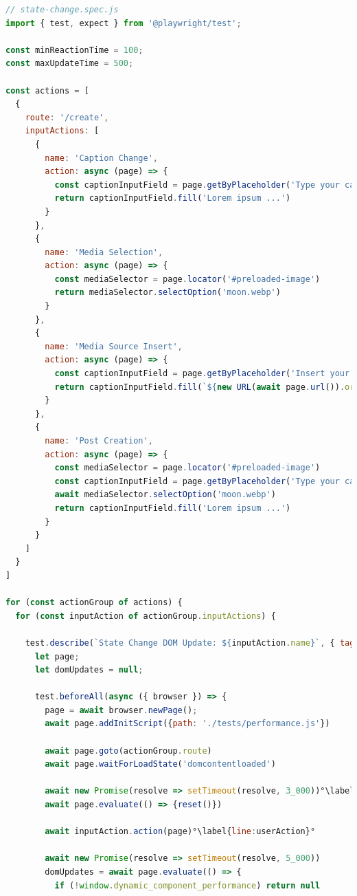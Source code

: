 \documentclass[a4paper, 10pt]{article}
\begin{document}
\begin{lstlisting}[caption={Test file for component update times}, label={lst:state-change-spec}, language=JavaScript, escapechar=°]
// state-change.spec.js
import { test, expect } from '@playwright/test';

const minReactionTime = 100;
const maxUpdateTime = 500;

const actions = [
  {
    route: '/create',
    inputActions: [
      {
        name: 'Caption Change',
        action: async (page) => {
          const captionInputField = page.getByPlaceholder('Type your caption here')
          return captionInputField.fill('Lorem ipsum ...')
        }
      },
      {
        name: 'Media Selection',
        action: async (page) => {
          const mediaSelector = page.locator('#preloaded-image')
          return mediaSelector.selectOption('moon.webp')
        }
      },
      {
        name: 'Media Source Insert',
        action: async (page) => {
          const captionInputField = page.getByPlaceholder('Insert your media URL here...')
          return captionInputField.fill(`${new URL(await page.url()).origin}/abstract-circles.webp`)
        }
      },
      {
        name: 'Post Creation',
        action: async (page) => {
          const mediaSelector = page.locator('#preloaded-image')
          const captionInputField = page.getByPlaceholder('Type your caption here')
          await mediaSelector.selectOption('moon.webp')
          return captionInputField.fill('Lorem ipsum ...')
        }
      }
    ]
  }
]

for (const actionGroup of actions) {
  for (const inputAction of actionGroup.inputActions) {

    test.describe(`State Change DOM Update: ${inputAction.name}`, { tag: [`@${inputAction.name.replace(/\s/g, '')}`, '@stateChange'] }, () => {
      let page;
      let domUpdates = null;

      test.beforeAll(async ({ browser }) => {
        page = await browser.newPage();
        await page.addInitScript({path: './tests/performance.js'})

        await page.goto(actionGroup.route)
        await page.waitForLoadState('domcontentloaded')

        await new Promise(resolve => setTimeout(resolve, 3_000))°\label{line:actionDelay}°
        await page.evaluate(() => {reset()})

        await inputAction.action(page)°\label{line:userAction}°

        await new Promise(resolve => setTimeout(resolve, 5_000))
        domUpdates = await page.evaluate(() => {
          if (!window.dynamic_component_performance) return null


\end{lstlisting}
\end{document}
